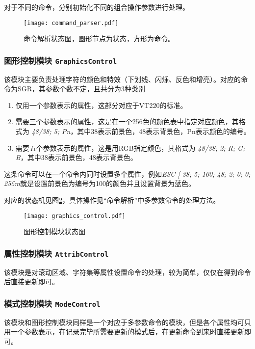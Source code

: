 对于不同的命令，分别初始化不同的组合操作参数进行处理。

\begin{landscape}
	\begin{figure}[htbp]
	\centerline{
	\texttt{[image: command\_parser.pdf]}
	}
	\caption{命令解析状态图，圆形节点为状态，方形为命令。}
	\label{fig:command_parser}
	\end{figure}
\end{landscape}


\subsubsection{图形控制模块 \texttt{GraphicsControl}}
该模块主要负责处理字符的颜色和特效（下划线、闪烁、反色和增亮）。对应的命令为SGR，其参数个数不定，且共分为3种类别
\begin{enumerate}
	\item 仅用一个参数表示的属性，这部分对应于VT220的标准。
	\item 需要三个参数表示的属性，这是在一个256色的颜色表中指定对应颜色，其格式为 {\it 48/38; 5; Pn}，其中38表示前景色，48表示背景色，Pn表示颜色的编号。
	\item 需要五个参数表示的属性，这是用RGB指定颜色，其格式为 {\it 48/38; 2; R; G; B}，其中38表示前景色，48表示背景色。
\end{enumerate}

这条命令可以在一个命令内同时设置多个属性，例如{\it ESC [ 38; 5; 100; 48; 2; 0; 0; 255m}就是设置前景色为编号为100的颜色并且设置背景为蓝色。

	对应的状态机见图\ref{fig:graphics_control}，具体操作见``命令解析''中多参数命令的处理方法。
\begin{figure}[htbp]
\centerline{
\texttt{[image: graphics\_control.pdf]}
}
\caption{图形控制模块状态图}
\label{fig:graphics_control}
\end{figure}
\subsubsection{属性控制模块 \texttt{AttribControl}}
该模块是对滚动区域、字符集等属性设置命令的处理，较为简单，仅仅在得到命令后直接更新即可。
\subsubsection{模式控制模块 \texttt{ModeControl}}
该模块和图形控制模块同样是一个对应于多参数命令的模块，但是各个属性均可只用一个参数表示，在记录完毕所需要更新的模式后，在更新命令到来时直接更新即可。